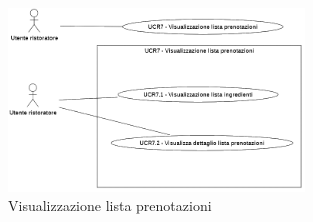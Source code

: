 \label{usecase:Visualizzazione lista prenotazioni}

\begin{figure}[h]
	\centering
	\includegraphics[width=0.7\textwidth]{./uml/UCR7.png} 
	\caption{Visualizzazione lista prenotazioni}
	\label{fig:UCR7}
  \end{figure}


